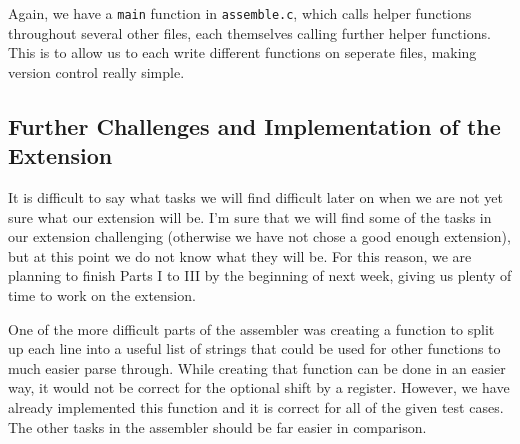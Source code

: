 \documentclass[10pt]{article}
\begin{document}
Again, we have a \texttt{main} function in \texttt{assemble.c}, which calls helper functions throughout several other files, each themselves calling further helper functions. This is to allow us to each write different functions on seperate files, making version control really simple.

\subsection{Further Challenges and Implementation of the Extension}

It is difficult to say what tasks we will find difficult later on when we are not yet sure what our extension will be. I'm sure that we will find some of the tasks in our extension challenging (otherwise we have not chose a good enough extension), but at this point we do not know what they will be. For this reason, we are planning to finish Parts I to III by the beginning of next week, giving us plenty of time to work on the extension.

One of the more difficult parts of the assembler was creating a function to split up each line into a useful list of strings that could be used for other functions to much easier parse through. While creating that function can be done in an easier way, it would not be correct for the optional shift by a register. However, we have already implemented this function and it is correct for all of the given test cases. The other tasks in the assembler should be far easier in comparison.
\end{document}
